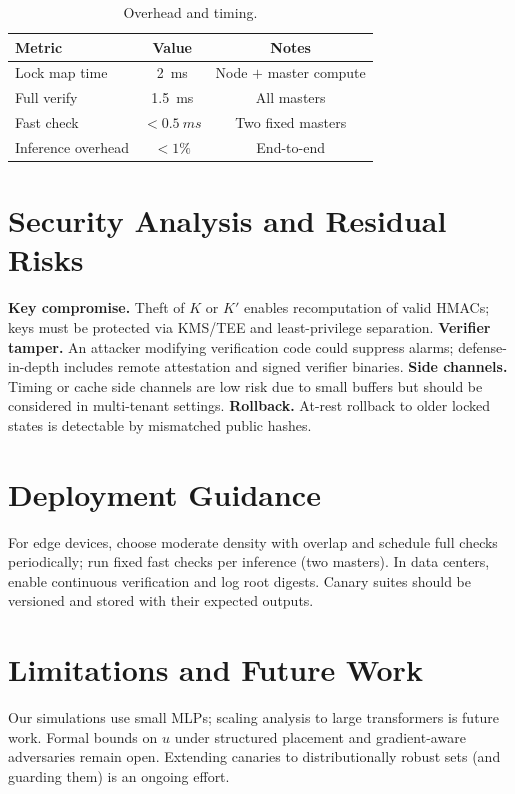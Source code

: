 \documentclass[11pt]{article}
\begin{document}
\begin{table}[h]
\centering
\caption{Overhead and timing.}
\begin{tabular}{lcc}
\toprule
Metric & Value & Notes \\
\midrule
Lock map time & \SI{2}{ms} & Node $+$ master compute \\
Full verify & \SI{1.5}{ms} & All masters \\
Fast check & $<\SI{0.5}{ms}$ & Two fixed masters \\
Inference overhead & $<1\%$ & End-to-end \\
\bottomrule
\end{tabular}
\end{table}


\section{Security Analysis and Residual Risks}
\textbf{Key compromise.} Theft of $K$ or $K'$ enables recomputation of valid HMACs; keys must be protected via KMS/TEE and least-privilege separation. \textbf{Verifier tamper.} An attacker modifying verification code could suppress alarms; defense-in-depth includes remote attestation and signed verifier binaries. \textbf{Side channels.} Timing or cache side channels are low risk due to small buffers but should be considered in multi-tenant settings. \textbf{Rollback.} At-rest rollback to older locked states is detectable by mismatched public hashes.

\section{Deployment Guidance}
For edge devices, choose moderate density with overlap and schedule full checks periodically; run fixed fast checks per inference (two masters). In data centers, enable continuous verification and log root digests. Canary suites should be versioned and stored with their expected outputs.

\section{Limitations and Future Work}
Our simulations use small MLPs; scaling analysis to large transformers is future work. Formal bounds on $u$ under structured placement and gradient-aware adversaries remain open. Extending canaries to distributionally robust sets (and guarding them) is an ongoing effort.
\end{document}
